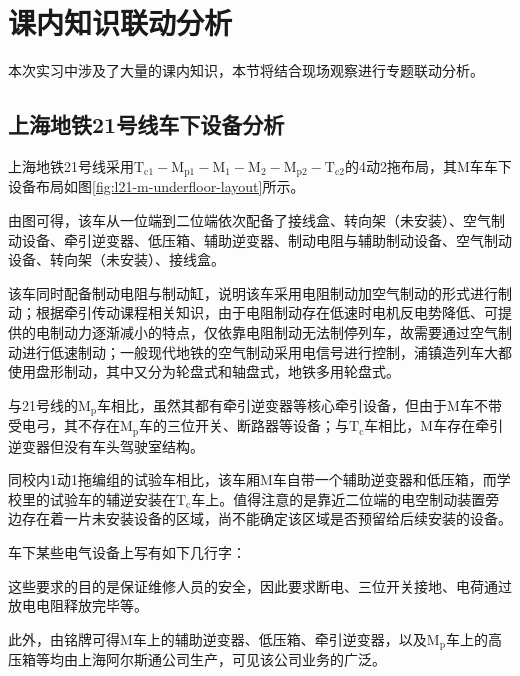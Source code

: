 ﻿\section{课内知识联动分析}
本次实习中涉及了大量的课内知识，本节将结合现场观察进行专题联动分析。\par{}

\subsection{上海地铁21号线车下设备分析}
上海地铁21号线采用$\mathrm{{T}_{c1}-{M}_{p1}-{M}_1-{M}_2-{M}_{p2}-{T}_{c2}}$的4动2拖布局，其$\mathrm{M}$车车下设备布局如图\ref{fig:l21-m-underfloor-layout}所示。\par{}
由图可得，该车从一位端到二位端依次配备了接线盒、转向架（未安装）、空气制动设备、牵引逆变器、低压箱、辅助逆变器、制动电阻与辅助制动设备、空气制动设备、转向架（未安装）、接线盒。\par{}
该车同时配备制动电阻与制动缸，说明该车采用电阻制动加空气制动的形式进行制动；根据牵引传动课程相关知识，由于电阻制动存在低速时电机反电势降低、可提供的电制动力逐渐减小的特点，仅依靠电阻制动无法制停列车，故需要通过空气制动进行低速制动；一般现代地铁的空气制动采用电信号进行控制，浦镇造列车大都使用盘形制动，其中又分为轮盘式和轴盘式，地铁多用轮盘式。\par{}
与21号线的$\mathrm{M_p}$车相比，虽然其都有牵引逆变器等核心牵引设备，但由于$\mathrm{M}$车不带受电弓，其不存在$\mathrm{M_p}$车的三位开关、断路器等设备；与$\mathrm{T_c}$车相比，$\mathrm{M}$车存在牵引逆变器但没有车头驾驶室结构。\par{}
同校内1动1拖编组的试验车相比，该车厢$\mathrm{M}$车自带一个辅助逆变器和低压箱，而学校里的试验车的辅逆安装在$\mathrm{T_c}$车上。值得注意的是靠近二位端的电空制动装置旁边存在着一片未安装设备的区域，尚不能确定该区域是否预留给后续安装的设备。\par{}
车下某些电气设备上写有如下几行字：\par{}
\noindent{}这些要求的目的是保证维修人员的安全，因此要求断电、三位开关接地、电荷通过放电电阻释放完毕等。\par{}
此外，由铭牌可得$\mathrm{M}$车上的辅助逆变器、低压箱、牵引逆变器，以及$\mathrm{M_p}$车上的高压箱等均由上海阿尔斯通公司生产，可见该公司业务的广泛。\par{}

